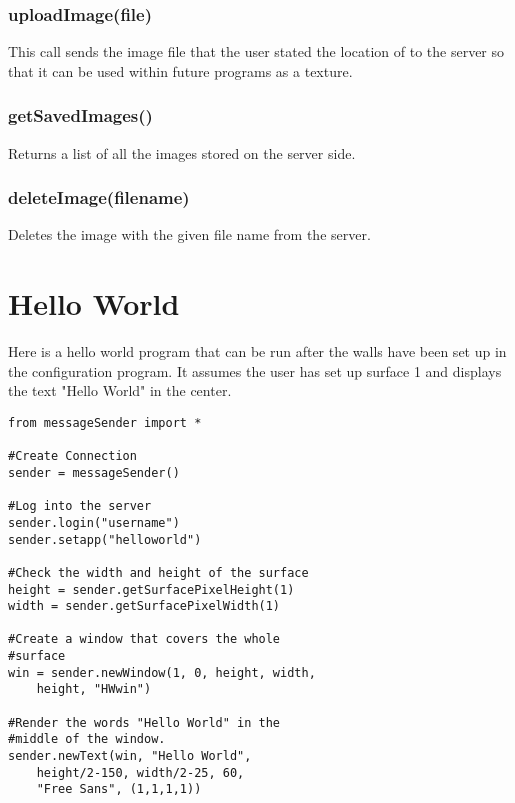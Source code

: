 \documentclass{acm_proc_article-sp}
\begin{document}
\subsubsection{uploadImage(file)}
This call sends the image file that the user stated the location of to the server so that it can be used within future programs as a texture.
\subsubsection{getSavedImages()}
Returns a list of all the images stored on the server side.
\subsubsection{deleteImage(filename)}
Deletes the image with the given file name from the server.
\section{Hello World}
Here is a hello world program that can be run after the walls have been set up in the configuration program. It assumes the user has set up surface 1 and displays the text "Hello World" in the center.
\lstset{language=Python}
\begin{lstlisting}[frame=single]
from messageSender import *

#Create Connection
sender = messageSender()

#Log into the server
sender.login("username")
sender.setapp("helloworld")

#Check the width and height of the surface
height = sender.getSurfacePixelHeight(1)
width = sender.getSurfacePixelWidth(1)

#Create a window that covers the whole 
#surface
win = sender.newWindow(1, 0, height, width, 
	height,	"HWwin")
	
#Render the words "Hello World" in the 
#middle of the window.
sender.newText(win, "Hello World", 
	height/2-150, width/2-25, 60, 
	"Free Sans", (1,1,1,1))
\end{lstlisting}
\end{document}

